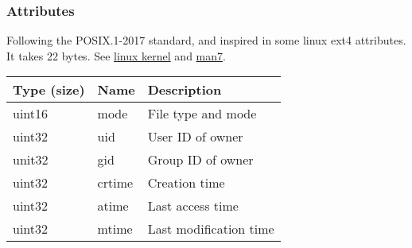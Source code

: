 \documentclass[]{article}
\begin{document}
	\subsubsection{Attributes}
	Following the POSIX.1-2017 standard, and inspired in some linux ext4 attributes. It takes 22 bytes.
	See \href{https://ext4.wiki.kernel.org/index.php/Ext4\_Disk\_Layout\#Inode\_Table}{linux kernel} and \href{https://man7.org/linux/man-pages/man3/stat.3type.html}{man7}.
	
	\begin{tabular}{|l|l|l|} 
		\hline
		\textbf{Type (size)} & \textbf{Name} & \textbf{Description} \\ [0.5ex] 
		\hline
		uint16 & mode & File type and mode \\
		\hline
		uint32 & uid & User ID of owner \\
		\hline
		unit32 & gid & Group ID of owner \\
		\hline
		uint32 & crtime & Creation time \\
		\hline
		uint32 & atime & Last access time \\
		\hline
		uint32 & mtime & Last modification time \\
		\hline
	\end{tabular}
\end{document}
